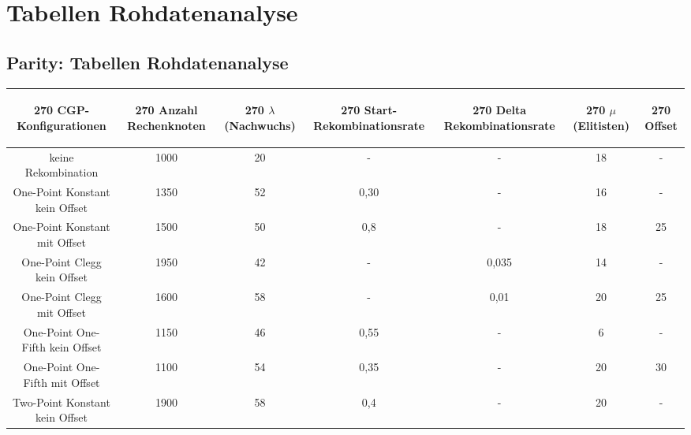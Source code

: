 \section{Tabellen Rohdatenanalyse}
\label{sec:tablesRohdatenanalyseAppendix}
\subsection{Parity: Tabellen Rohdatenanalyse}
\label{subsec:appendixTabellenRohdatenanalyseParity}
\begin{table}[H]
	\centering
	\begin{tabular}{c | c | c | c | c | c | c}
		\begin{turn}{270} \textbf{CGP-Konfigurationen} \end{turn} & \begin{turn}{270} \textbf{Anzahl Rechenknoten} \end{turn} & \begin{turn}{270} \textbf{$\lambda$ (Nachwuchs)} \end{turn} & \begin{turn}{270} \textbf{Start-Rekombinationsrate} \end{turn} & \begin{turn}{270} \textbf{Delta Rekombinationsrate} \end{turn} & \begin{turn}{270} \textbf{$\mu$ (Elitisten)} \end{turn} & \begin{turn}{270} \textbf{Offset} \end{turn}\\
		\hline
		keine Rekombination & 1000 & 20 & - & - & 18 & -\\
		\hline
		\hline
		One-Point Konstant kein Offset & 1350 & 52 & 0,30 & - & 16 & - \\
		\hline
		One-Point Konstant mit Offset & 1500 & 50 & 0,8 & - & 18 & 25 \\
		\hline
		One-Point Clegg kein Offset & 1950 & 42 & - & 0,035 & 14 & - \\
		\hline
		One-Point Clegg mit Offset & 1600 & 58 & - & 0,01 & 20 & 25 \\
		\hline
		One-Point One-Fifth kein Offset & 1150 & 46 & 0,55 & - & 6 & - \\
		\hline
		One-Point One-Fifth mit Offset & 1100 & 54 & 0,35 & - & 20 & \color{red}30\color{black} \\
		\hline
		\hline
		Two-Point Konstant kein Offset & 1900 & 58 & 0,4 & - & 20 & - \\

\end{tabular}
\end{table}
